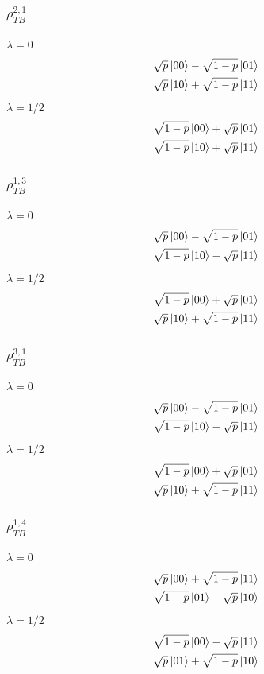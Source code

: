 \documentclass[12pt]{article}
\begin{document}
\subsubsection*{$\rho_{TB}^{2,1}$}
$\lambda = 0$
\begin{align*}
    \sqrt{p}\ket{00} - \sqrt{1-p}\ket{01} \\
    \sqrt{p}\ket{10} + \sqrt{1-p}\ket{11} 
\end{align*}
$\lambda = 1/2$
\begin{align*}
    \sqrt{1-p}\ket{00} + \sqrt{p}\ket{01} \\
    \sqrt{1-p}\ket{10} + \sqrt{p}\ket{11}
\end{align*}

\subsubsection*{$\rho_{TB}^{1,3}$}
$\lambda = 0$
\begin{align*}
    \sqrt{p}\ket{00} - \sqrt{1-p}\ket{01} \\
    \sqrt{1-p}\ket{10} - \sqrt{p}\ket{11}
\end{align*}
$\lambda = 1/2$
\begin{align*}
    \sqrt{1-p}\ket{00} + \sqrt{p}\ket{01} \\
    \sqrt{p}\ket{10} + \sqrt{1-p}\ket{11}
\end{align*}

\subsubsection*{$\rho_{TB}^{3,1}$}
$\lambda = 0$
\begin{align*}
    \sqrt{p}\ket{00} - \sqrt{1-p}\ket{01} \\
    \sqrt{1-p}\ket{10} - \sqrt{p}\ket{11}
\end{align*}
$\lambda = 1/2$
\begin{align*}
    \sqrt{1-p}\ket{00} + \sqrt{p}\ket{01} \\
    \sqrt{p}\ket{10} + \sqrt{1-p}\ket{11}
\end{align*}

\subsubsection*{$\rho_{TB}^{1,4}$}
$\lambda = 0$
\begin{align*}
    \sqrt{p}\ket{00} + \sqrt{1-p}\ket{11} \\
    \sqrt{1-p}\ket{01} - \sqrt{p}\ket{10}
\end{align*}
$\lambda = 1/2$
\begin{align*}
    \sqrt{1-p}\ket{00} - \sqrt{p}\ket{11} \\
    \sqrt{p}\ket{01} + \sqrt{1-p}\ket{10}
\end{align*}
\end{document}
